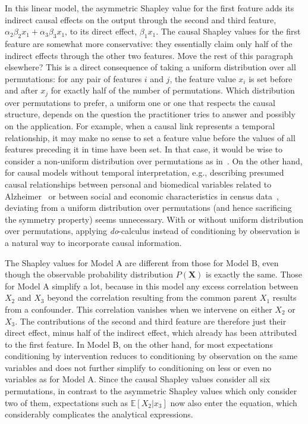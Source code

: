 \documentclass{article}
\newcommand{\vX}{\mathbf{X}}
\newcommand{\expectation}{\mathbb{E}}
\newcommand{\comment}[1]{{\color{red} #1}}
\begin{document}
In this linear model, the asymmetric Shapley value for the first feature adds its indirect causal effects on the output through the second and third feature, $\alpha_2 \beta_2 x_1 + \alpha_3 \beta_3 x_1$, to its direct effect, $\beta_1 x_1$. The causal Shapley values for the first feature are somewhat more conservative: they essentially claim only half of the indirect effects through the other two features. \comment{Move the rest of this paragraph elsewhere?} This is a direct consequence of taking a uniform distribution over all permutations: for any pair of features $i$ and $j$, the feature value $x_i$ is set before and after $x_j$ for exactly half of the number of permutations. Which distribution over permutations to prefer, a uniform one or one that respects the causal structure, depends on the question the practitioner tries to answer and possibly on the application. For example, when a causal link represents a temporal relationship, it may make no sense to set a feature value before the values of all features preceding it in time have been set. In that case, it would be wise to consider a non-uniform distribution over permutations as in~\cite{frye2019asymmetric}. On the other hand, for causal models without temporal interpretation, e.g., describing presumed causal relationships between personal and biomedical variables related to Alzheimer~\cite{shen2020challenges} or between social and economic characteristics in census data~\cite{chiappa2019path}, deviating from a uniform distribution over permutations (and hence sacrificing the symmetry property) seems unnecessary. With or without uniform distribution over permutations, applying \textit{do}-calculus instead of conditioning by observation is a natural way to incorporate causal information.

The Shapley values for Model A are different from those for Model B, even though the observable probability distribution $P(\vX)$ is exactly the same. Those for Model A simplify a lot, because in this model any excess correlation between $X_2$ and $X_3$ beyond the correlation resulting from the common parent $X_1$ results from a confounder. This correlation vanishes when we intervene on either $X_2$ or $X_3$. The contributions of the second and third feature are therefore just their direct effect, minus half of the indirect effect, which already has been attributed to the first feature. In Model B, on the other hand, for most expectations conditioning by intervention reduces to conditioning by observation on the same variables and does not further simplify to conditioning on less or even no variables as for Model A. Since the causal Shapley values consider all six permutations, in contrast to the asymmetric Shapley values which only consider two of them, expectations such as $\expectation[X_2|x_3]$ now also enter the equation, which considerably complicates the analytical expressions.
\end{document}

